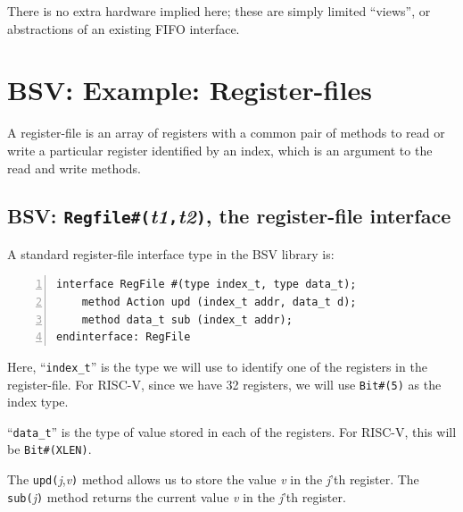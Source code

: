 There is no extra hardware implied here; these are simply limited
``views'', or abstractions of an existing FIFO interface.


\section{BSV: Example: Register-files}


A register-file is an array of registers with a common pair of methods
to read or write a particular register identified by an index, which
is an argument to the read and write methods.


\subsection{BSV: {\tt Regfile\#(}\emph{t1}{\tt ,}\emph{t2}{\tt )}, the register-file interface}

\label{Sec_CPU_Module_Skeleton_RegFile_interface}



A standard register-file interface type in the BSV library is:

\begin{Verbatim}[frame=single, numbers=left]
interface RegFile #(type index_t, type data_t);
    method Action upd (index_t addr, data_t d);
    method data_t sub (index_t addr);
endinterface: RegFile
\end{Verbatim}

Here, ``\verb|index_t|'' is the type we will use to identify one of
the registers in the register-file.  For RISC-V, since we have 32
registers, we will use \verb|Bit#(5)| as the index type.

``\verb|data_t|'' is the type of value stored in each of the
registers.  For RISC-V, this will be \verb|Bit#(XLEN)|.

The \verb|upd(|\emph{j},\emph{v}\verb|)| method allows us to store the
value \emph{v} in the \emph{j}'th register.  The
\verb|sub(|\emph{j}\verb|)| method returns the current value \emph{v}
in the \emph{j}'th register.

